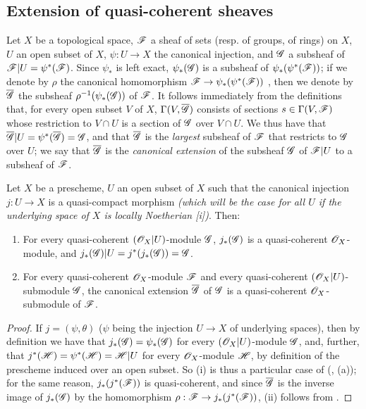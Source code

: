 \subsection{Extension of quasi-coherent sheaves}
\label{subsection:extension-of-qcoh}

\begin{env}[9.4.1]
\label{1.9.4.1}
Let
$X$ be a topological space, $\mathscr{F}$ a sheaf of sets (resp. of groups, of rings) on $X$, $U$
an open subset of $X$, $\psi:U\to X$ the canonical injection, and $\mathscr{G}$ a subsheaf of
$\mathscr{F}|U=\psi^*(\mathscr{F})$. Since $\psi_*$ is left exact, $\psi_*(\mathscr{G})$ is a subsheaf of
$\psi_*(\psi^*(\mathscr{F}))$; if we denote by $\rho$ the canonical homomorphism
$\sh{F}\to\psi_*(\psi^*(\sh{F}))$ , then we denote by $\overline{\mathscr{G}}$
the subsheaf $\rho^{-1}(\psi_*(\mathscr{G}))$ of $\mathscr{F}$. It follows immediately from the
definitions that, for every open subset $V$ of $X$, $\Gamma(V,\overline{\mathscr{G}})$ consists of
sections $s\in\Gamma(V,\mathscr{F})$ whose restriction to $V\cap U$ is a section of $\mathscr{G}$ over
$V\cap U$. We thus have that $\overline{\mathscr{G}}|U=\psi^*(\overline{\mathscr{G}})=\mathscr{G}$, and that
$\overline{\mathscr{G}}$ is the \emph{largest} subsheaf of $\mathscr{F}$ that restricts to $\mathscr{G}$
over $U$; we say that $\overline{\mathscr{G}}$ is the \emph{canonical extension} of the subsheaf
$\mathscr{G}$ of $\mathscr{F}|U$ to a subsheaf of $\mathscr{F}$.
\end{env}

\begin{prop}[9.4.2]
\label{1.9.4.2}
Let $X$ be a prescheme, $U$ an open subset of $X$ such that the canonical injection
$j:U\to X$ is a quasi-compact morphism \emph{(which will be the case for \emph{all} $U$ if
the underlying space of $X$ is \emph{locally Noetherian}
[i])}. Then:
\begin{enumerate}[label=\emph{(\roman*)}]
  \item For every quasi-coherent $(\mathscr{O}_X|U)$-module $\mathscr{G}$, $j_*(\mathscr{G})$
    is a quasi-coherent $\mathscr{O}_X$-module, and $j_*(\mathscr{G})|U=j^*(j_*(\mathscr{G}))=\mathscr{G}$.
  \item For every quasi-coherent $\mathscr{O}_X$-module $\mathscr{F}$ and every quasi-coherent
    $(\mathscr{O}_X|U)$-submodule $\mathscr{G}$, the canonical extension
    $\overline{\mathscr{G}}$ of $\mathscr{G}$  is a
    quasi-coherent $\mathscr{O}_X$-submodule of $\mathscr{F}$.
\end{enumerate}
\end{prop}

\begin{proof}
\label{proof-1.9.4.2}
If $j=(\psi,\theta)$ ($\psi$ being the injection $U\to X$ of underlying spaces), then by
definition we have that $j_*(\mathscr{G})=\psi_*(\mathscr{G})$ for every $(\mathscr{O}_X|U)$-module $\mathscr{G}$,
and, further, that $j^*(\mathscr{H})=\psi^*(\mathscr{H})=\mathscr{H}|U$ for every $\mathscr{O}_X$-module $\mathscr{H}$,
by definition of the prescheme induced over an open subset. So (i) is thus a particular case
of (, (a)); for the same reason, $j_*(j^*(\mathscr{F}))$ is quasi-coherent, and
since $\overline{\mathscr{G}}$ is the inverse image of $j_*(\mathscr{G})$ by the homomorphism
$\rho:\sh{F}\to j_*(j^*(\sh{F}))$, (ii) follows from .
\end{proof}

